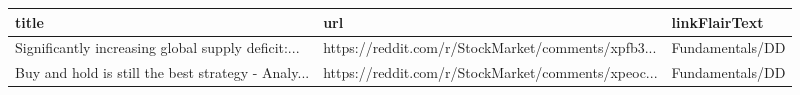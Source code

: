 \documentclass{article}%
\begin{document}
%


\begin{table}[htbp]%
\centering%
\begin{adjustbox}{width=1\textwidth}%
\begin{tabular}{lll}
\toprule
                                             title &                                                url &   linkFlairText \\
\midrule
Significantly increasing global supply deficit:... & https://reddit.com/r/StockMarket/comments/xpfb3... & Fundamentals/DD \\
Buy and hold is still the best strategy - Analy... & https://reddit.com/r/StockMarket/comments/xpeoc... & Fundamentals/DD \\
\bottomrule
\end{tabular}
%
\end{adjustbox}%
\end{table}

%
\end{document}
